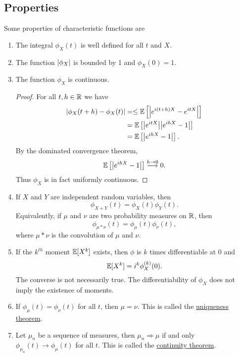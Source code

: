 \subsection{Properties}
Some properties of characteristic functions are
\renewcommand\labelenumi{(\theenumi)}
\begin{enumerate}
    \item The integral $\phi_X(t)$ is well defined for all $t$ and $X$.
    \item The function ${\left\lvert\phi_X\right\rvert}$ is bounded by 1 and $\phi_X(0)=1$.
    \item The function $\phi_X$ is continuous.
    \begin{proof}
        For all $t,h \in {\mathbb R}$ we have
        \begin{align*}
            {\left\lvert\phi_X(t+h)-\phi_X(t)\right\rvert} &=\le {\mathbb{E}}\left[{\left\lvert e^{i(t+h)X}-e^{itX}\right\rvert}\right]\\
            &={\mathbb{E}}\left[{\left\lvert e^{itX}\right\rvert}{\left\lvert e^{ihX}-1\right\rvert}\right]\\
            &={\mathbb{E}}\left[{\left\lvert e^{ihX}-1\right\rvert}\right].
        \end{align*}
        By the dominated convergence theorem, 
        \[ {\mathbb{E}}\left[{\left\lvert e^{ihX}-1\right\rvert}\right]\stackrel{h\to 0}{\longrightarrow} 0 .\]
        Thus $\phi_X$ is in fact uniformly continuous.
    \end{proof}
    \item If $X$ and $Y$ are independent random variables, then 
    \[\phi_{X+Y}(t)=\phi_X(t)\phi_Y(t).\]
    Equivalently, if $\mu$ and $\nu$ are two probability measures on ${\mathbb R}$, then 
    \[\phi_{\mu *\nu}(t)=\phi_\mu(t)\phi_\nu(t), \]
    where $\mu*\nu$ is the convolution of $\mu$ and $\nu$.
    \item If the $k^{th}$ moment ${\mathbb{E}}[X^k]$ exists, then $\phi$ is $k$ times differentiable at 0 and
    \[{\mathbb{E}}[X^k] = i^k \phi^{(k)}_X(0).\]
    The converse is not necessarily true. The differentiability of $\phi_X$ does not imply the existence of moments.
    \item If $\phi_\mu(t)=\phi_\nu(t)$ for all $t$, then $\mu = \nu$. This is called the \underline{uniqueness theorem}.
    \item Let $\mu_n$ be a sequence of measures, then $\mu_n \Rightarrow \mu$ if and only $\phi_{\mu_n}(t) \to \phi_\mu(t)$ for all $t$. This is called the \underline{continuity theorem}.
\end{enumerate}
